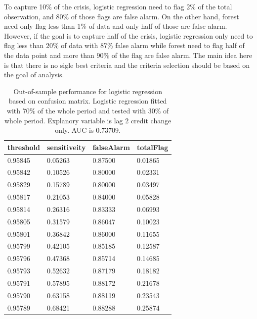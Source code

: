 \documentclass{article}
\begin{document}
To capture 10\% of the crisis,
logistic regression need to flag 2\% of the total observation, and 80\%
of those flags are false alarm. On the other hand, forest need only flag
less than 1\% of data and only half of those are false alarm. However,
if the goal is to capture half of the crisis, logistic regression only
need to flag less than 20\% of data with 87\% false alarm while forest
need to flag half of the data point and more than 90\% of the flag are
false alarm. The main idea here is that there is no sigle best criteria
and the criteria selection should be based on the goal of analysis.

\begin{multicols}{2}
\begin{table}[H]
        \caption{Out-of-sample performance for logistic regression based on confusion matrix.
        Logistic regression fitted with 70\% of the whole period and
        tested with 30\% of whole period. Explanory variable is lag 2
        credit change only. AUC is 0.73709.}
        \begin{tabular}{|l|l|l|l|}
        \hline
         threshold         & sensitiveity        & falseAlarm         & totalFlag            \\ \hline
        0.95845 & 0.05263 & 0.87500              & 0.01865 \\ \hline
        0.95842 & 0.10526 & 0.80000                & 0.02331 \\ \hline
        0.95829 & 0.15789 & 0.80000                & 0.03497  \\ \hline
        0.95817 & 0.21053 & 0.84000               & 0.05828  \\ \hline
        0.95814 & 0.26316  & 0.83333 & 0.06993  \\ \hline
        0.95805 & 0.31579  & 0.86047 & 0.10023  \\ \hline
        0.95801 & 0.36842  & 0.86000               & 0.11655  \\ \hline
        0.95799 & 0.42105 & 0.85185 & 0.12587   \\ \hline
        0.95796 & 0.47368 & 0.85714 & 0.14685  \\ \hline
        0.95793 & 0.52632  & 0.87179 & 0.18182  \\ \hline
        0.95791 & 0.57895  & 0.88172 & 0.21678  \\ \hline
        0.95790 & 0.63158   & 0.88119 & 0.23543  \\ \hline
        0.95789 & 0.68421  & 0.88288 & 0.25874  \\ \hline

\end{tabular}
\end{table}
\end{multicols}
\end{document}
